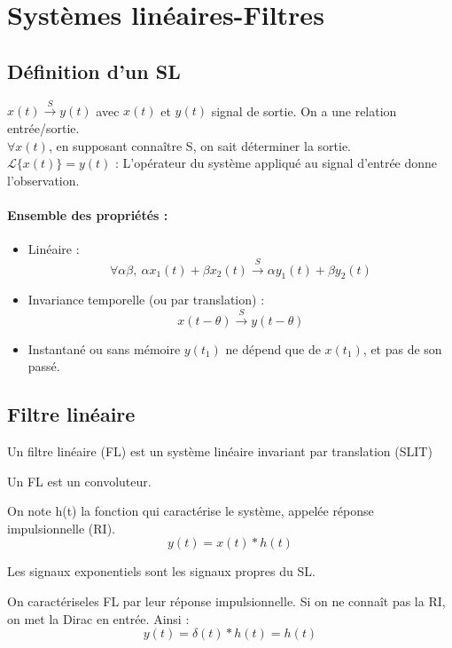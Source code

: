 \section{Systèmes linéaires-Filtres}
\subsection{Définition d'un SL}
$x(t)\xrightarrow{S}y(t)$ avec $x(t)$ et $y(t)$ signal de sortie. On a une relation entrée/sortie. \\
$\forall x(t)$, en supposant connaître S, on sait déterminer la sortie.\\
$\mathcal{L}\{x(t)\} = y(t)$ : L'opérateur du système appliqué au signal d'entrée donne l'observation.

\paragraph{Ensemble des propriétés :}
\begin{itemize}
\item Linéaire : \[\forall \alpha \beta,\ \alpha x_1(t)+\beta x_2(t) \xrightarrow{S} \alpha y_1(t) + \beta y_2 (t)\]
\item Invariance temporelle (ou par translation) : \[x(t-\theta) \xrightarrow{S} y(t-\theta)\]
\item Instantané ou sans mémoire $y(t_1)$ ne dépend que de $x(t_1)$, et pas de son passé.
\end{itemize}

\subsection{Filtre linéaire}
\begin{Def}
Un filtre linéaire (FL) est un système linéaire invariant par translation (SLIT)
\end{Def}

\begin{Def}
Un FL est un convoluteur.
\end{Def}
On note h(t) la fonction qui caractérise le système, appelée réponse impulsionnelle (RI).
\[y(t)=x(t)*h(t)\]

\begin{Def}
Les signaux exponentiels sont les signaux propres du SL.
\end{Def}

On caractériseles FL par leur réponse impulsionnelle. Si on ne connaît pas la RI, on met la Dirac en entrée. Ainsi : \[y(t)=\delta(t)*h(t)=h(t)\]

